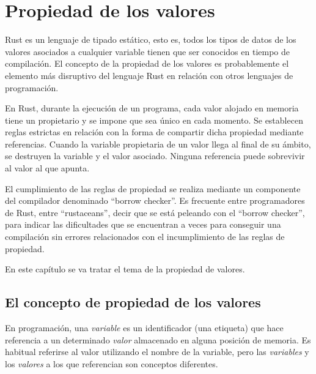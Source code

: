\blankpage

\chapter{Propiedad de los valores}
\label{ch_propiedad}

\IndiceCapitulo

\begin{Resumen}
Rust es un lenguaje de tipado estático, esto es, todos los tipos de datos de los valores asociados a cualquier variable  tienen que ser conocidos en tiempo de compilación. El concepto de la propiedad de los valores es probablemente el elemento más disruptivo del lenguaje Rust en relación con otros lenguajes de programación.

\smallskip

En Rust, durante la ejecución de un programa, cada valor alojado en memoria tiene un propietario y se impone que sea único en cada momento. Se establecen reglas estrictas en relación con la forma de compartir dicha propiedad mediante referencias. Cuando la variable propietaria de un valor llega al final de su ámbito, se destruyen la variable y el valor asociado. Ninguna referencia puede sobrevivir al valor al que apunta.

\smallskip

El cumplimiento de las reglas de propiedad se realiza mediante un componente del compilador denominado ``borrow checker''. Es frecuente entre programadores de Rust, entre ``rustaceans'', decir que se está peleando con el ``borrow checker'', para indicar las dificultades que se encuentran a veces para conseguir una compilación sin errores relacionados con el incumplimiento de las reglas de propiedad.

\smallskip

En este capítulo se va tratar el tema de la propiedad de valores. 

\end{Resumen}


\section{El concepto de propiedad de los valores}
\label{sec_propiedad}

\noindent En programación, una \textit{variable} es un identificador (una etiqueta) que hace referencia a un determinado \textit{valor} almacenado en alguna posición de memoria. Es habitual referirse al valor utilizando el nombre de la variable, pero las \textit{variables} y los \textit{valores} a los que referencian son conceptos diferentes.

